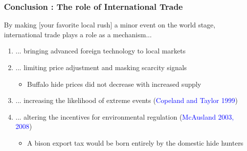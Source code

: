 \documentclass[aspectratio=169, 12pt, final]{beamer}
\begin{document}



\begin{frame}
\frametitle{Conclusion : The role of International Trade}
By making [your favorite local rush] a minor event on the world stage, international trade plays a role as a mechanism...
\begin{enumerate}
	\item ... bringing advanced foreign technology to local markets
	\item ... limiting price adjustment and masking scarcity signals
	\begin{itemize}
		\item Buffalo hide prices did not decrease with increased supply
	\end{itemize}
	\item ... increasing the likelihood of extreme events (\textcolor{blue}{Copeland and Taylor 1999}) 
	\item ... altering the incentives for environmental regulation (\textcolor{blue}{McAusland 2003, 2008})
	\begin{itemize}
		\item A bison export tax would be born entirely by the domestic hide hunters
	\end{itemize}
\end{enumerate}
\end{frame}

	
\end{document}
